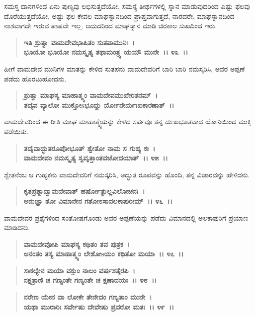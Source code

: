 ಸಮಸ್ತ ದಾನಗಳಿಂದ ಏನು ಪುಣ್ಯವು ಲಭಿಸುತ್ತದೆಯೋ, ಸಮಸ್ಯೆ ತೀರ್ಥಗಳಲ್ಲಿ ಸ್ನಾನ ಮಾಡುವುದರಿಂದ ಎಷ್ಟು ಫಲವು ದೊರೆಯುತ್ತದೆಯೋ, ಅಷ್ಟು ಫಲ ಕೇವಲ ಮಾಘಸ್ನಾನದಿಂದ ಪ್ರಾಪ್ತವಾಗುತ್ತದೆ, ನಾರದರೇ, ಮಾಘಸ್ನಾನದಿಂದ ನಾಶವಾಗದೇ ಇರುವ ಪಾಪವೇ ಇಲ್ಲ. ಆದುದರಿಂದ ಮಾಘಸ್ನಾನ ಮಾಡಿ ಚಿರಕಾಲ ಸುಖದಿಂದ ಇರು.

\begin{verse}
\textbf{ಇತಿ ಶ್ರುತ್ವಾ ವಾಮದೇವಭಾಷಿತಂ ಸುತಪಾಮುನಿಃ~।}\\\textbf{ಭೂಯೋ ಭೂಯೋ ನಮಸ್ಕೃತ್ಯ ತಥಾಮಂತ್ರ್ಯ ಯಯೌ ಮುನೇ~।। ೪೩~।।}
\end{verse}

ಹೀಗೆ ವಾಮದೇವ ಮುನಿಗಳ ಮಾತನ್ನು ಕೇಳಿದ ಸುತಪನು ವಾಮದೇವರಿಗೆ ಬಾರಿ ಬಾರಿ ನಮಸ್ಕರಿಸಿ, ಅವರ ಅಪ್ಪಣೆ ಪಡೆದು ಹೊರಟುಹೋದನು.

\begin{verse}
\textbf{ಶ್ರುತ್ವಾ ಮಾಘಸ್ಯ ಮಾಹಾತ್ಮ್ಯಂ ವಾಮದೇವಮುಖೇರಿತನಮ್~।}\\\textbf{ತದೈವ ವ್ಯಾಲೋ ಮುಕ್ತೋsಭೂದ್ದು ರ್ಯೋನೇರ್ದುಃಖಕಾರಣಾತ್~।।}
\end{verse}

ವಾಮದೇವರಿಂದ ಈ ರೀತಿ ಮಾಘ ಮಾಹಾತ್ಮ್ಯೆಯನ್ನು ಕೇಳಿದ ಸರ್ಪವೂ ತನ್ನ ದುಃಖಭೂತವಾದ ಯೋನಿಯಿಂದ ಮುಕ್ತಿ ಪಡೆಯಿತು.

\begin{verse}
\textbf{ತದೈವಾದ್ಭುತರೂಪೋಭೂತ್ ಶ್ವೇತೋ ನಾಮ ಸ ಗುಹ್ಯ ಕಃ~।}\\\textbf{ವಾಮದೇವಂ ನಮಸ್ಕೃತ್ಯ ಸ್ವವೃತ್ತಾಂತವಚೋದಯಾತ್~।। ೪೫~।।}
\end{verse}

ಶ್ವೇತನೆಂಬ ಆ ಗುಹ್ಯಕನು ವಾಮದೇವರಿಗೆ ನಮಸ್ಕರಿಸಿ, ಅದ್ಭುತ ರೂಪವನ್ನು ಹೊಂದಿ, ತನ್ನ ವಿಚಾರವನ್ನು ಹೇಳಿದನು.

\begin{verse}
\textbf{ಕೃತಪ್ರಶ್ನಾದ್ವಾಮದೇವಾತ್ ಹರ್ಷೋತ್ಫುಲ್ಲವಿಲೋಚನಃ~।}\\\textbf{ಅನುಜ್ಞಾ ತೋ ವಿಮಾನೇನ ಗತೋಽಸಾವಲಕಾಪುರೀಮ್~।। ೪೬~।।}
\end{verse}

ವಾಮದೇವರ ಪ್ರಶ್ನೆಗಳಿಂದ ಸಂತೋಷಗೊಂಡು ಅವರ ಅಪ್ಪಣೆಯನ್ನು ಪಡೆದು ವಿಮಾನದಲ್ಲಿ ಅಲಕಾಪುರಿಗೆ ಪ್ರಯಾಣ ಮಾಡಿದನು.

\begin{verse}
\textbf{ವಾಮದೇವೋಪಿ ಮಾಘಸ್ಯ ಕಥಿತಂ ತವ ಪುತ್ರಕ~।}\\\textbf{ಅನಂತಂ ತಸ್ಯ ಮಾಹಾತ್ಮ್ಯಂ ಲೇಶೋsಯಂ ಕಥಿತೋ ಮಯಾ~।। ೪೭~।। }
\end{verse}

\begin{verse}
\textbf{ಸಾಕಲ್ಯೇನ ಮಯಾ ವಕ್ತುಂ ನಾಲಂ ವರ್ಷಶತೈರಪಿ~।}\\\textbf{ನಕ್ಷತ್ರಾಣಿ ಚ ಗಣ್ಯಂತೇ ಗಣ್ಯಂತೇ ಚ ಕ್ಷಣಾದಯಃ~।। ೪೮~।।} 
\end{verse}

\begin{verse}
\textbf{ನರೇಣ ಯೇನ ವಾ ಲೋಕೇ ತೇನೇದಂ ಗಣ್ಯತಾಂ ಮುನೇ~।}\\\textbf{ಯಥಾ ಮುರಾರಿಃ ಸರ್ವೇಷು ದೇವೇಷು ಪ್ರವರೋ ಮತಃ~।। ೪೯~।।}
\end{verse}

